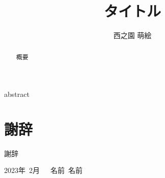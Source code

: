 \documentclass[bachelor,supervisor]{keieithesis} %
\title{タイトル}%
\author{西之園 萌絵}%
\begin{document}
\maketitle
\frontmatter

\begin{eabstract}
abstract
\end{eabstract}

\begin{abstract}
概要

\end{abstract}

\tableofcontents

\mainmatter







\backmatter%
\chapter*{謝辞}

謝辞
\begin{flushright}
2023年~2月~~~名前~名前
\end{flushright}



% 

\appendix

\end{document}
